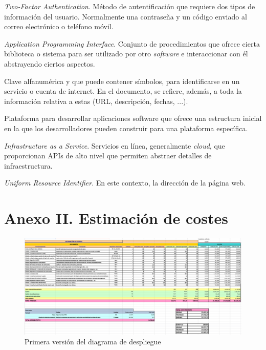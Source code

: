 \documentclass{article}
\begin{document}
\begin{description}
    \setlength\itemsep{0em}
    \item[2FA] \textit{Two-Factor Authentication}. Método de autentificación que requiere dos tipos de información del usuario. Normalmente una contraseña y un código enviado al correo electrónico o teléfono móvil.
    \item[API] \textit{Application Programming Interface}. Conjunto de procedimientos que ofrece cierta biblioteca o sistema para ser utilizado por otro \textit{software} e interaccionar con él abstrayendo ciertos aspectos.
    \item[Contraseña] Clave alfanumérica y que puede contener símbolos, para identificarse en un servicio o cuenta de internet. En el documento, se refiere, además, a toda la información relativa a estas (URL, descripción, fechas, ...).
    \item[Framework] Plataforma para desarrollar aplicaciones software que ofrece una estructura inicial en la que los desarrolladores pueden construir para una plataforma específica. 
    \item[IaaS] \textit{Infrastructure as a Service}. Servicios en línea, generalmente \textit{cloud}, que proporcionan APIs de alto nivel que permiten abstraer detalles de infraestructura.
    \item[URL] \textit{Uniform Resource Identifier}. En este contexto, la dirección de la página web. 
\end{description}

\pagebreak

\section*{Anexo II. Estimación de costes}

\begin{figure}[H]
    \centering
    \begin{adjustbox}{max size={\textwidth}{\textheight-5em}}
        \includegraphics[angle=90]{../images/propuesta_economica.png}
    \end{adjustbox}
    \caption{Primera versión del diagrama de despliegue}
    \label{despliegueV1}
\end{figure}


\end{document}

